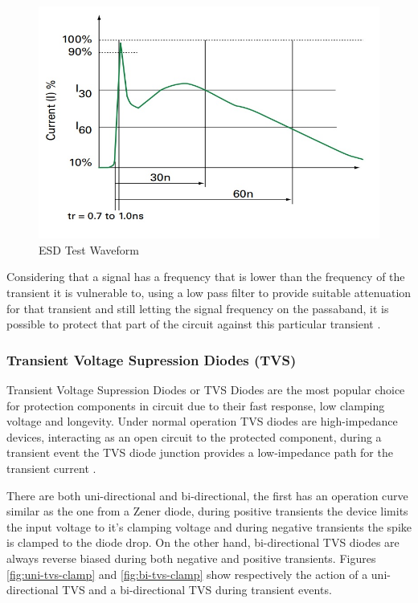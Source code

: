		\begin{figure}[htbp]
			\centering
			\includegraphics[width=.5\textwidth]{figuras/fig-esd-test-waveform}
			\caption{ESD Test Waveform \cite{esd-test-waveform}}
			\label{fig:esd-test-waveform}
		\end{figure}

		Considering that a signal has a frequency that is lower than the frequency of the transient it is vulnerable to, using a low pass filter to provide suitable attenuation for that transient and still letting the signal frequency on the passaband, it is possible to protect that part of the circuit against this particular transient \cite{standler1988use}. 


	\subsubsection{Transient Voltage Supression Diodes (TVS)}\label{sssec:tvsTransientProtection}

		\label{ssssec:tvsOperation}
			Transient Voltage Supression Diodes or TVS Diodes are the most popular choice for protection components in circuit due to their fast response, low clamping voltage and longevity. Under normal operation TVS diodes are high-impedance devices, interacting as an open circuit to the protected component, during a transient event the TVS diode junction provides a low-impedance path for the transient current \cite{renesasTVS}.
			\par
			There are both uni-directional and bi-directional, the first has an operation curve similar as the one from a Zener diode, during positive transients the device limits the input voltage to it's clamping voltage and during negative transients the spike is clamped to the diode drop. On the other hand, bi-directional TVS diodes are always reverse biased during both negative and positive transients. Figures \ref{fig:uni-tvs-clamp} and \ref{fig:bi-tvs-clamp} show respectively the action of a uni-directional TVS and a bi-directional TVS during transient events.

